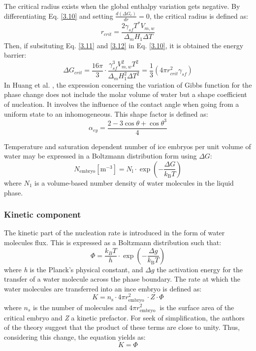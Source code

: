 The critical radius exists when the global enthalpy variation gets negative.
\newline
By differentiating Eq. \ref{3.10} and setting $\frac{d(\Delta G_c)}{dr} = 0$, the critical radius is defined as:
\begin{equation}
	\label{2.20}
	r_{c r i t}=\frac{2 \gamma_{s f} T^{*} V_{m, w}}{\Delta_{m} H_{1} \Delta T}
\end{equation}
Then, if subsituting Eq. \ref{3.11} and \ref{3.12} in Eq. \ref{3.10}, it is obtained the energy barrier:
\begin{equation}
	\label{2.21}
	\Delta G_{c r i t}=\frac{16 \pi}{3} \cdot \frac{\gamma_{s f}^{3} V_{m, w}^{2} T^{2}}{\Delta_{m} H_{1}^{2} \Delta T^{2}}=\frac{1}{3}\left(4 \pi r_{c r i t}^{2} \gamma_{s f}\right)
\end{equation}
In Huang et al. \cite{huang_wang_li_2020}, the expression concerning the variation of Gibbs function for the phase change does not include the molar volume of water but a shape coefficient of nucleation. It involves the influence of the contact angle when going from a uniform state to an inhomogeneous. This shape factor is defined as:
\begin{equation}
	\label{2.22}
	\alpha_{e y}=\frac{2-3 \cos \theta+\cos \theta^{3}}{4}
\end{equation}

Temperature and saturation dependent number of ice embryos per unit volume of water may be expressed in a Boltzmann distribution form using $\Delta G$:
\begin{equation}
	\label{2.23}
	N_{\mathrm{embryo}}\left[\mathrm{m}^{-3}\right]=N_{\mathrm{l}} \cdot \exp \left(-\frac{\Delta G}{k_{\mathrm{B}} T}\right)
\end{equation}
where $N_{1}$ is a volume-based number density of water molecules in the liquid phase.
\subsubsection*{Kinetic component}
The kinetic part of the nucleation rate is introduced in the form of water molecules flux. This is expressed as a Boltzmann distribution such that:
\begin{equation}
	\label{2.24}
	\Phi=\frac{k_{B} T}{h} \cdot \exp \left(-\frac{\Delta g}{k_{\mathrm{B}} T}\right)
\end{equation}
where \textit{h} is the Planck's physical constant, and $\Delta g$ the activation energy for the transfer of a water molecule across the phase boundary.
\newline
The rate at which the water molecules are transferred into an ince embryo is defined as:
\begin{equation}
	\label{2.25}
	K=n_{\mathrm{s}} \cdot 4 \pi r_{\text {embryo }}^{2} \cdot Z \cdot \Phi
\end{equation}
where $n_s$ is the number of molecules and $4 \pi r_{\text {embryo }}^{2}$ is the surface area of the critical embryo and \textit{Z} a kinetic prefactor. For seek of simplification, the authors of the theory suggest that the product of these terms are close to unity. Thus, considering this change, the equation yields as:
\begin{equation}
	\label{2.26}
	K=\Phi
\end{equation}
